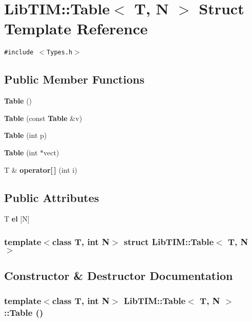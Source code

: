 \section{Lib\-TIM::Table$<$ T, N $>$ Struct Template Reference}
\label{structLibTIM_1_1Table}
{\tt \#include $<$Types.h$>$}

\subsection*{Public Member Functions}
\begin{CompactItemize}
\item 
{\bf Table} ()
\item 
{\bf Table} (const {\bf Table} \&v)
\item 
{\bf Table} (int p)
\item 
{\bf Table} (int $\ast$vect)
\item 
T \& {\bf operator[$\,$]} (int i)
\end{CompactItemize}
\subsection*{Public Attributes}
\begin{CompactItemize}
\item 
T {\bf el} [N]
\end{CompactItemize}
\subsubsection*{template$<$class T, int N$>$ struct Lib\-TIM::Table$<$ T, N $>$}



\subsection{Constructor \& Destructor Documentation}
\subsubsection{\setlength{\rightskip}{0pt plus 5cm}template$<$class T, int N$>$ {\bf Lib\-TIM::Table}$<$ T, N $>$::{\bf Table} ()\hspace{0.3cm}{\tt  [inline]}}\label{structLibTIM_1_1Table_a0}


